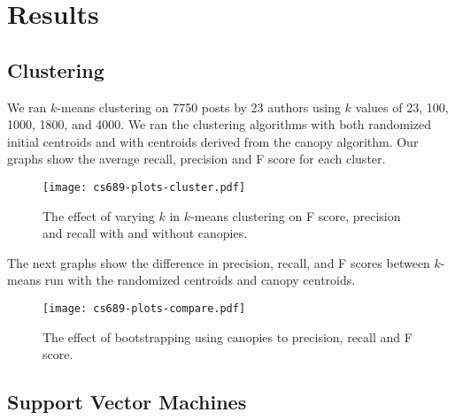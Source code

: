 \documentclass[12pt]{article}
\begin{document}
\section{Results}
\subsection{Clustering}
We ran $k$-means clustering on 7750 posts by 23 authors using $k$ values of 23, 100, 1000, 1800, and 4000. We ran the clustering algorithms with both randomized initial centroids and with centroids derived from the canopy algorithm. Our graphs show the average recall, precision and F score for each cluster.

\begin{figure}
\begin{center}
\texttt{[image: cs689-plots-cluster.pdf]}
\end{center}
\caption{The effect of varying $k$ in $k$-means clustering on F score, precision and recall with and without canopies.}
\end{figure}

The next graphs show the difference in precision, recall, and F scores between $k$-means run with the randomized centroids and canopy centroids.

\begin{figure}
\begin{center}
\texttt{[image: cs689-plots-compare.pdf]}
\end{center}
\caption{The effect of bootstrapping using canopies to precision, recall and F score.}
\end{figure}

\subsection{Support Vector Machines}
\end{document}
